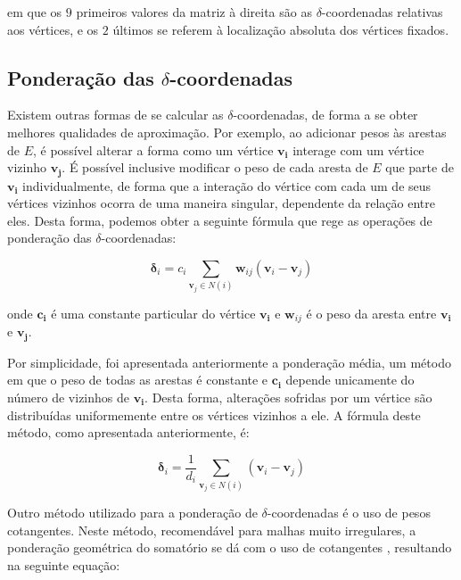 \noindent em que os $9$ primeiros valores da matriz à direita são as $\delta$-coordenadas relativas aos vértices, e os $2$ últimos se referem à localização absoluta dos vértices fixados.

\subsection{Ponderação das $\delta$-coordenadas}
\label{Pondera}

Existem outras formas de se calcular as $\delta$-coordenadas, de forma a se obter melhores qualidades de aproximação. Por exemplo, ao adicionar pesos às arestas de $E$, é possível alterar a forma como um vértice $\mathbf{v_i}$ interage com um vértice vizinho $\mathbf{v_j}$. É possível inclusive modificar o peso de cada aresta de $E$ que parte de $\mathbf{v_i}$ individualmente, de forma que a interação do vértice com cada um de seus vértices vizinhos ocorra de uma maneira singular, dependente da relação entre eles. Desta forma, podemos obter a seguinte fórmula que rege as operações de ponderação das $\delta$-coordenadas:

\begin{equation}
\mathbf{\delta}_i = {c_i} \sum_{\mathbf{v}_j \in N(i)} \mathbf{w}_{ij}(\mathbf{v}_i - \mathbf{v}_j)
\label{eq_forpon}
\end{equation}

\noindent onde $\mathbf{c_i}$ é uma constante particular do vértice $\mathbf{v_i}$ e $\mathbf{w}_{ij}$ é o peso da aresta entre $\mathbf{v_i}$ e $\mathbf{v_j}$.

 Por simplicidade, foi apresentada anteriormente a ponderação média, um método em que o peso de todas as arestas é constante e $\mathbf{c_i}$ depende unicamente do número de vizinhos de $\mathbf{v_i}$. Desta forma, alterações sofridas por um vértice são distribuídas uniformemente entre os vértices vizinhos a ele. A fórmula deste método, como apresentada anteriormente, é: 

\begin{equation}
    \mathbf{\delta}_i = \frac{1}{d_i} \sum_{\mathbf{v}_j \in N(i)} (\mathbf{v}_i - \mathbf{v}_j)
\end{equation}

Outro método utilizado para a ponderação de $\delta$-coordenadas é o uso de pesos cotangentes. Neste método, recomendável para malhas muito irregulares, a ponderação geométrica do somatório se dá com o uso de cotangentes \cite{pinkall:1996}, resultando na seguinte equação:

